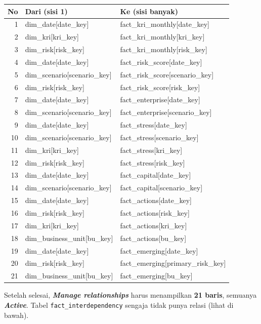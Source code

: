 \documentclass[11pt,a4paper]{article}
\newcommand{\file}[1]{\texttt{\small #1}}
\newcommand{\ui}[1]{\textbf{\textit{#1}}}
\begin{document}
\begin{longtable}{r>{\ttfamily\small}p{6.0cm}>{\ttfamily\small}p{6.6cm}}
\toprule
\textbf{No} & \textrm{\textbf{Dari (sisi 1)}} & \textrm{\textbf{Ke (sisi banyak)}} \\
\midrule
\endhead
1 & dim\_date[date\_key] & fact\_kri\_monthly[date\_key] \\
2 & dim\_kri[kri\_key] & fact\_kri\_monthly[kri\_key] \\
3 & dim\_risk[risk\_key] & fact\_kri\_monthly[risk\_key] \\
4 & dim\_date[date\_key] & fact\_risk\_score[date\_key] \\
5 & dim\_scenario[scenario\_key] & fact\_risk\_score[scenario\_key] \\
6 & dim\_risk[risk\_key] & fact\_risk\_score[risk\_key] \\
7 & dim\_date[date\_key] & fact\_enterprise[date\_key] \\
8 & dim\_scenario[scenario\_key] & fact\_enterprise[scenario\_key] \\
9 & dim\_date[date\_key] & fact\_stress[date\_key] \\
10 & dim\_scenario[scenario\_key] & fact\_stress[scenario\_key] \\
11 & dim\_kri[kri\_key] & fact\_stress[kri\_key] \\
12 & dim\_risk[risk\_key] & fact\_stress[risk\_key] \\
13 & dim\_date[date\_key] & fact\_capital[date\_key] \\
14 & dim\_scenario[scenario\_key] & fact\_capital[scenario\_key] \\
15 & dim\_date[date\_key] & fact\_actions[date\_key] \\
16 & dim\_risk[risk\_key] & fact\_actions[risk\_key] \\
17 & dim\_kri[kri\_key] & fact\_actions[kri\_key] \\
18 & dim\_business\_unit[bu\_key] & fact\_actions[bu\_key] \\
19 & dim\_date[date\_key] & fact\_emerging[date\_key] \\
20 & dim\_risk[risk\_key] & fact\_emerging[primary\_risk\_key] \\
21 & dim\_business\_unit[bu\_key] & fact\_emerging[bu\_key] \\
\bottomrule
\end{longtable}

\begin{tipbox}
Setelah selesai, \ui{Manage relationships} harus menampilkan \textbf{21 baris}, semuanya \ui{Active}. Tabel \file{fact\_interdependency} sengaja tidak punya relasi (lihat di bawah).
\end{tipbox}
\end{document}
